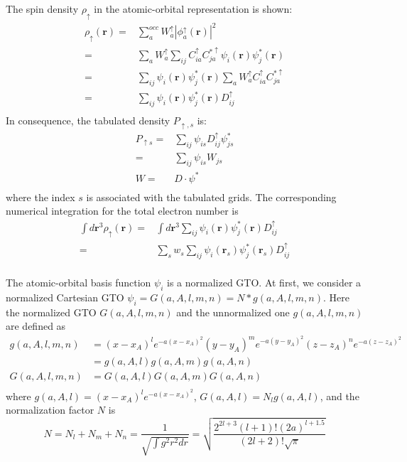 \documentclass[a4paper,12pt]{article}
\begin{document}
The spin density $\rho_{\uparrow}$ in the atomic-orbital representation is shown:
\begin{equation}
	\begin{split}
		\rho_{\uparrow}(\textbf{r}) = &\sum_{a}^{occ}W_{a}^{\uparrow}|\phi_a^{\uparrow}(\textbf{r})|^2\\
		= &\sum_{a}W_{a}^{\uparrow}\sum_{ij}C_{ia}^{\uparrow}C_{ja}^{*\uparrow}\psi_i(\textbf{r})\psi_j^*(\textbf{r})\\
		= &\sum_{ij}\psi_i(\textbf{r})\psi_j^*(\textbf{r})\sum_{a}W_{a}^{\uparrow}C_{ia}^{\uparrow}C_{ja}^{*\uparrow}\\
		= &\sum_{ij}\psi_i(\textbf{r})\psi_j^*(\textbf{r})D_{ij}^{\uparrow}\\
	\end{split}
\end{equation}
In consequence, the tabulated density $P_{\uparrow,s}$ is:
\begin{equation}
	\begin{split}
		P_{\uparrow s} = &\sum_{ij}\psi_{is}D_{ij}^{\uparrow}\psi_{js}^{*}\\
		= &\sum_{ij}\psi_{is}W_{js}\\
		W = &D\cdot \psi^*\\
	\end{split}
\end{equation}
where the index $s$ is associated with the tabulated grids. The corresponding numerical integration for the total electron number is
\begin{equation}
	\begin{split}
		\int d\textbf{r}^3 \rho_{\uparrow}(\textbf{r}) = &\int d\textbf{r}^3\sum_{ij}\psi_i(\textbf{r})\psi_j^*(\textbf{r})D_{ij}^{\uparrow}\\
		= &\sum_{s}w_s\sum_{ij}\psi_i(\textbf{r}_s)\psi_j^*(\textbf{r}_s)D_{ij}^{\uparrow}\\
	\end{split}
\end{equation}

The atomic-orbital basis function $\psi_i$ is a normalized GTO. At first, we consider a normalized Cartesian GTO 
$\psi_i = G(a,A,l,m,n) = N*g(a,A,l,m,n)$. Here the normalized GTO $G(a,A,l,m,n)$ and the unnormalized one $g(a,A,l,m,n)$ are defined as 
\begin{equation}
	\begin{split}
	    g(a,A,l,m,n) &= (x-x_{A})^{l}e^{-a (x-x_{A})^2}(y-y_{A})^{m}e^{-a (y-y_{A})^2}(z-z_{A})^{n}e^{-a (z-z_{A})^2}\\
	                 &= g(a,A,l)g(a,A,m)g(a,A,n)\\
	    G(a,A,l,m,n) &= G(a,A,l)G(a,A,m)G(a,A,n)\\
	\end{split}
\end{equation}
where  $g(a,A,l) = (x-x_{A})^{l} e^{-a (x-x_{A})^2}$, $G(a,A,l)=N_l g(a,A,l)$, and the normalization factor $N$ is
\begin{equation}
	N = N_{l}+N_{m}+N_{n}=\frac{1}{\sqrt{\int g^2 r^2 dr}}
    = \sqrt{\frac{2^{2l+3} (l+1)! (2a)^{l+1.5}}{(2l+2)!\sqrt{\pi}}}
\end{equation}
\end{document}
